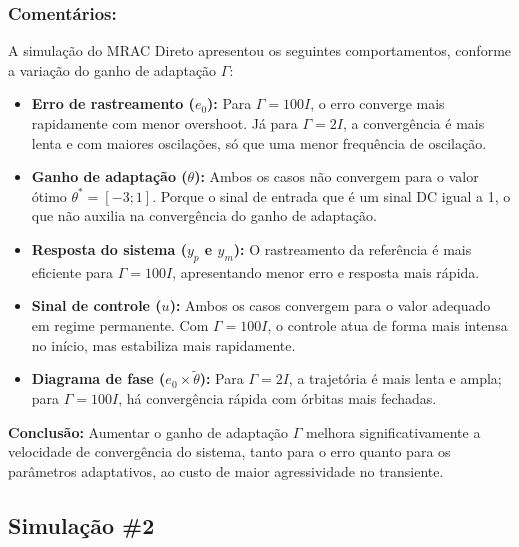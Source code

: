 \documentclass[10pt]{article}
\begin{document}
\subsubsection{Comentários:}

A simulação do MRAC Direto apresentou os seguintes comportamentos, conforme a variação do ganho de adaptação $\Gamma$:

\begin{itemize}
    \item \textbf{Erro de rastreamento ($e_0$):} Para $\Gamma = 100I$, o erro converge mais rapidamente com menor overshoot. Já para $\Gamma = 2I$, a convergência é mais lenta e com maiores oscilações, só que uma menor frequência de oscilação.

    \item \textbf{Ganho de adaptação ($\theta$):} Ambos os casos não convergem para o valor ótimo $\theta^* = [-3;1]$. Porque o sinal de entrada que é um sinal DC igual a 1, o que não auxilia na convergência do ganho de adaptação.

    \item \textbf{Resposta do sistema ($y_p$ e $y_m$):} O rastreamento da referência é mais eficiente para $\Gamma = 100I$, apresentando menor erro e resposta mais rápida.

    \item \textbf{Sinal de controle ($u$):} Ambos os casos convergem para o valor adequado em regime permanente. Com $\Gamma = 100I$, o controle atua de forma mais intensa no início, mas estabiliza mais rapidamente.

    \item \textbf{Diagrama de fase ($e_0 \times \tilde{\theta}$):} Para $\Gamma = 2I$, a trajetória é mais lenta e ampla; para $\Gamma = 100I$, há convergência rápida com órbitas mais fechadas.

\end{itemize}

\textbf{Conclusão:} Aumentar o ganho de adaptação $\Gamma$ melhora significativamente a velocidade de convergência do sistema, tanto para o erro quanto para os parâmetros adaptativos, ao custo de maior agressividade no transiente.

\newpage

\subsection{Simulação \#2}
\end{document}
